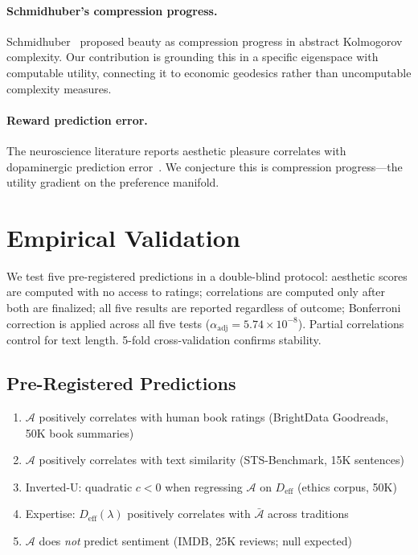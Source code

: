 \documentclass[journal]{IEEEtran}
\theoremstyle{definition}
\theoremstyle{remark}
\begin{document}
\paragraph{Schmidhuber's compression progress.}
Schmidhuber~\cite{schmidhuber2009simple} proposed beauty as
compression progress in abstract Kolmogorov complexity.  Our
contribution is grounding this in a specific eigenspace with
computable utility, connecting it to economic geodesics rather than
uncomputable complexity measures.

\paragraph{Reward prediction error.}
The neuroscience literature reports aesthetic pleasure correlates
with dopaminergic prediction error~\cite{salimpoor2011anatomically}.
We conjecture this is compression progress---the utility gradient
on the preference manifold.


\section{Empirical Validation}
\label{sec:empirical}

We test five pre-registered predictions in a double-blind protocol:
aesthetic scores are computed with no access to ratings; correlations
are computed only after both are finalized; all five results are
reported regardless of outcome; Bonferroni correction is applied
across all five tests ($\alpha_{\mathrm{adj}} = 5.74 \times 10^{-8}$).
Partial correlations control for text length.  5-fold
cross-validation confirms stability.

\subsection{Pre-Registered Predictions}

\begin{enumerate}
\item[\textbf{P1}] $\mathcal{A}$ positively correlates with human
book ratings (BrightData Goodreads, 50K book summaries)
\item[\textbf{P2}] $\mathcal{A}$ positively correlates with text
similarity (STS-Benchmark, 15K sentences)
\item[\textbf{P3}] Inverted-U: quadratic $c < 0$ when regressing
$\mathcal{A}$ on $D_{\mathrm{eff}}$ (ethics corpus, 50K)
\item[\textbf{P4}] Expertise: $D_{\mathrm{eff}}(\lambda)$ positively
correlates with $\bar{\mathcal{A}}$ across traditions
\item[\textbf{P5}] $\mathcal{A}$ does \emph{not} predict sentiment
(IMDB, 25K reviews; null expected)
\end{enumerate}
\end{document}
